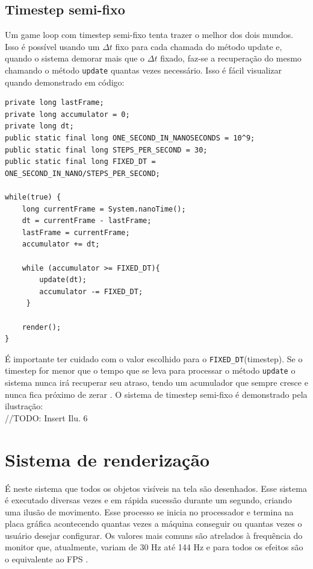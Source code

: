 \documentclass[12pt, 
openright, 
oneside, 
a4paper,    
brazil]{facom-ufu-abntex2}
\begin{document}
\subsection{Timestep semi-fixo}
Um game loop com timestep semi-fixo tenta trazer o melhor dos dois mundos. Isso é possível usando um $\Delta t$ fixo para cada chamada do método update e, quando o sistema demorar mais que o $\Delta t$ fixado, faz-se a recuperação do mesmo chamando o método \texttt{update} quantas vezes necessário.
Isso é fácil visualizar quando demonstrado em código:
\begin{lstlisting}[caption=Game Loop com timestep semi-fixo]
private long lastFrame;
private long accumulator = 0;
private long dt;
public static final long ONE_SECOND_IN_NANOSECONDS = 10^9;
public static final long STEPS_PER_SECOND = 30;
public static final long FIXED_DT = ONE_SECOND_IN_NANO/STEPS_PER_SECOND;
			
while(true) {
	long currentFrame = System.nanoTime(); 
	dt = currentFrame - lastFrame;
	lastFrame = currentFrame;
	accumulator += dt;
	
	while (accumulator >= FIXED_DT){
    	update(dt);
    	accumulator -= FIXED_DT;
 	 }
 			 
	render();
}
\end{lstlisting}
É importante ter cuidado com o valor escolhido para o \texttt{FIXED_DT}(timestep). Se o timestep for menor que o tempo que se leva para processar o método \texttt{update} o sistema nunca irá recuperar seu atraso, tendo um acumulador que sempre cresce e nunca fica próximo de zerar \cite{GameProgrammingPatterns}.
O sistema de timestep semi-fixo é demonstrado pela ilustração:
\\//TODO: Insert Ilu. 6
 
\section{Sistema de renderização}
É neste sistema que todos os objetos visíveis na tela são desenhados. Esse sistema é executado diversas vezes e em rápida sucessão durante um segundo, criando uma ilusão de movimento. Esse processo se inicia no processador e termina na placa gráfica acontecendo quantas vezes a máquina conseguir ou quantas vezes o usuário desejar configurar. Os valores mais comuns são atrelados à frequência do monitor que, atualmente, variam de 30 Hz até 144 Hz e para todos os efeitos são o equivalente ao FPS \cite{GameEngineArchitecture}.
\end{document}
